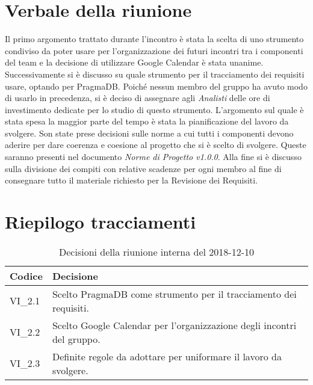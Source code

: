 \section{Verbale della riunione}
Il primo argomento trattato durante l'incontro è stata la scelta di uno strumento 
condiviso da poter usare per l'organizzazione dei futuri incontri tra i componenti
del team e la decisione di utilizzare Google Calendar è stata unanime.
Successivamente si è discusso su quale strumento per il tracciamento dei requisiti
usare, optando per PragmaDB\glo{}. Poiché nessun membro del gruppo ha 
avuto modo di usarlo in precedenza, si è deciso di assegnare agli \textit{Analisti}
delle ore di investimento dedicate per lo studio di questo strumento. 
L'argomento sul quale è stata spesa la maggior parte del tempo è stata la 
pianificazione del lavoro da svolgere. Son state prese decisioni sulle norme a
cui tutti i componenti devono aderire per dare coerenza e coesione al progetto
che si è scelto di svolgere. Queste saranno presenti nel documento 
\textit{Norme di Progetto v1.0.0}. Alla fine si è discusso sulla divisione dei 
compiti con relative scadenze per ogni membro al fine di consegnare tutto il 
materiale richiesto per la Revisione dei Requisiti. 
\pagebreak
\section{Riepilogo tracciamenti}

	
\begin{longtable}{ >{\centering}p{} >{}p{}}
	\caption{Decisioni della riunione interna del 2018-12-10}\\	
	\rowcolorhead
	\textbf{\color{white}Codice} 
	& \centering\textbf{\color{white}Decisione} 
	\tabularnewline 
	\endfirsthead
		VI\_2.1 & Scelto PragmaDB come strumento per il tracciamento dei
				requisiti.
		
		\tabularnewline 
		VI\_2.2 & Scelto Google Calendar per l'organizzazione degli 
				incontri del gruppo.
		
		\tabularnewline 
		VI\_2.3 & Definite regole da adottare per uniformare il lavoro da 
		svolgere.
	
	
	\end{longtable}
	



